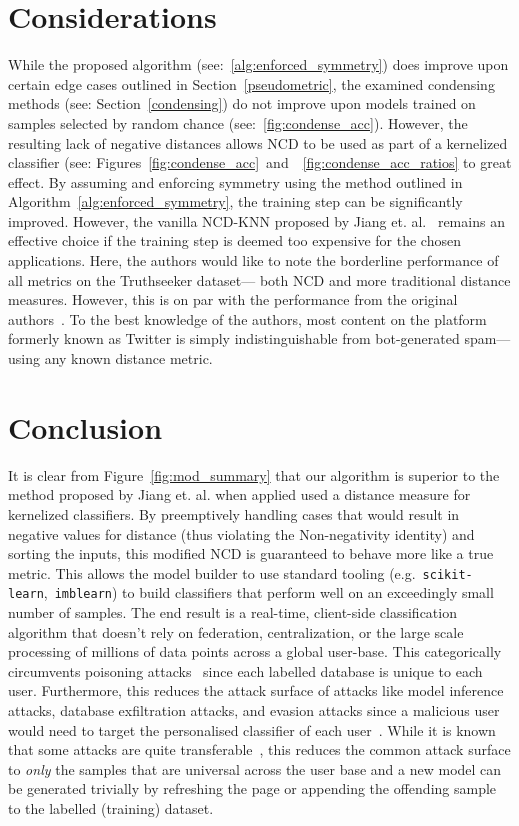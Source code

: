\documentclass[conference]{IEEEtran}
\begin{document}
\section{Considerations}
\label{considerations}
While the proposed algorithm (see:~\ref{alg:enforced_symmetry}) does improve upon certain edge cases outlined in Section~\ref{pseudometric}, the examined condensing methods (see: Section~\ref{condensing}) do not improve upon models trained on samples selected by random chance (see:~\ref{fig:condense_acc}). However, the resulting lack of negative distances allows NCD to be used as part of a kernelized classifier (see: Figures~\ref{fig:condense_acc}~and~~\ref{fig:condense_acc_ratios} to great effect. 
By assuming and enforcing symmetry using the method outlined in Algorithm~\ref{alg:enforced_symmetry}, the training step can be significantly improved.
However, the vanilla NCD-KNN proposed by Jiang et. al.~\cite{jiang2022less} remains an effective choice if the training step is deemed too expensive for the chosen applications.
Here, the authors would like to note the borderline performance of all metrics on the Truthseeker dataset--- both NCD and more traditional distance measures. However, this is on par with the performance from the original authors~\cite{truthseeker}. To the best knowledge of the authors, most content on the platform formerly known as Twitter is simply indistinguishable from bot-generated spam--- using any known distance metric.


\section{Conclusion}
It is clear from Figure~\ref{fig:mod_summary} that our algorithm is superior to the method proposed by Jiang et. al. when applied used a distance measure for kernelized classifiers. By preemptively handling cases that would result in negative values for distance (thus violating the Non-negativity identity) and sorting the inputs, this modified NCD is guaranteed to behave more like a true metric. 
This allows the model builder to use standard tooling (e.g.~\texttt{scikit-learn},~\texttt{imblearn}) to build classifiers that perform well on an exceedingly small number of samples. The end result is a real-time, client-side classification algorithm that doesn't rely on federation, centralization, or the large scale processing of millions of data points across a global user-base. 
This categorically circumvents poisoning attacks~\cite{biggio_poisoning_2013} since each labelled database is unique to each user. 
Furthermore, this reduces the attack surface of attacks like model inference attacks, database exfiltration attacks, and evasion attacks since a malicious user would need to target the personalised classifier of each user~\cite{biggio_evasion_2013,deepfool,chakraborty_adversarial_2018}. 
While it is known that some attacks are quite transferable~\cite{wang2021enhancing}, this reduces the common attack surface to \textit{only} the samples that are universal across the user base and a new model can be generated trivially by refreshing the page or appending the offending sample to the labelled (training) dataset. 


\label{conclusion}



\newpage


% 
% 
% 
% 
\end{document}
